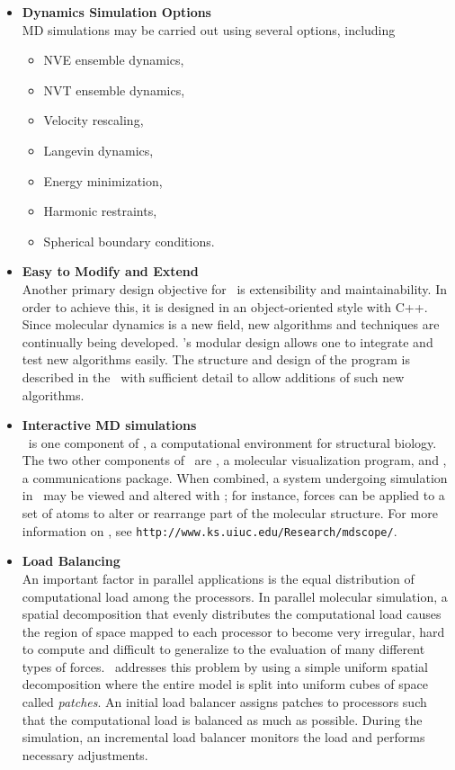 \begin{itemize}
\item{\bf Dynamics Simulation Options}\\
MD simulations may be carried out using several options, including
\begin{itemize}
  \item NVE ensemble dynamics,
  \item NVT ensemble dynamics,
  \item Velocity rescaling,
  \item Langevin dynamics,
  \item Energy minimization,
  \item Harmonic restraints,
  \item Spherical boundary conditions.
\end{itemize}

\item{\bf Easy to Modify and Extend}\\
Another primary design objective for \NAMD\ is extensibility and 
maintainability. In order to achieve this, it is designed in an 
object-oriented style with C++. Since molecular dynamics is a new field,
new algorithms and techniques are continually being developed.
\NAMD's modular design allows one to integrate and test new algorithms 
easily.  The structure and design of the program 
is described in the \PG\ with sufficient
detail to allow additions of such
new algorithms.

\item{\bf Interactive MD simulations}\\
\NAMD\ is one component of \ALLNAMES, a computational environment for
structural biology.  The two other components of \ALLNAMES\ are \VMD,
a molecular visualization program, and \MDCOMM, a communications package.
When combined, a system undergoing simulation in \NAMD\ may be viewed and
altered with \VMD; for instance, forces can be applied to a set of atoms
to alter or rearrange part of the molecular structure.  For more information
on \ALLNAMES, see {\tt http://www.ks.uiuc.edu/Research/mdscope/}.  

\item{\bf Load Balancing}\\
An important factor in parallel applications is the equal distribution
of computational load among the processors. In parallel molecular simulation,
a spatial decomposition that evenly distributes the computational load
causes the region of space mapped to each processor to become very irregular, 
hard to compute and difficult to generalize to the evaluation of many different
types of forces.  \NAMD\ addresses this problem by using a simple uniform 
spatial decomposition where the entire model is split into uniform cubes of 
space called {\em patches}. An initial load balancer assigns patches
to processors such that the computational load is balanced as much as possible.
During the simulation, an incremental load balancer monitors the load
and performs necessary adjustments.

\end{itemize}

